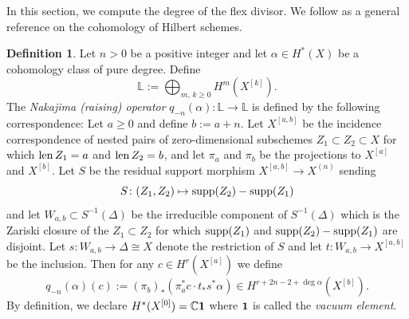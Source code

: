 \documentclass{amsart}
\theoremstyle{definition}
\newtheorem{definition}[theorem]{Definition}
\newcommand{\C}{\mathbb{C}}
\begin{document}
In this section, we compute the degree of the flex divisor. We follow
\cite{ellingsrud2000hilbert}
as a general reference on the cohomology of Hilbert schemes.
%
%


\begin{definition}\label{nakajima} Let $n>0$ be a positive integer and let $\alpha\in H^*(X)$ be a
cohomology class of pure degree. Define $$\mathbb{L}:=\bigoplus_{m,\,k\geq 0} H^m(X^{[k]}).$$
The {\it Nakajima (raising) operator} $q_{-n}(\alpha):\mathbb{L}\to \mathbb{L}$ is defined by
the following correspondence: Let $a\geq 0$ and define $b:=a+n$. Let $X^{[a,b]}$ 
be the incidence correspondence of nested pairs of zero-dimensional 
subschemes $Z_1\subset Z_2\subset X$ for which ${\rm len}\,Z_1=a$ and ${\rm len}\,Z_2=b$,
and let $\pi_a$ and $\pi_b$ be the projections to $X^{[a]}$ and $X^{[b]}$. Let $S$ be the 
residual support morphism $X^{[a,b]}\to X^{(n)}$ sending
$$S\colon (Z_1, Z_2)\mapsto {\rm supp}(Z_2)-{\rm supp}(Z_1)$$ and let $W_{a,b}\subset S^{-1}(\Delta)$
be the irreducible component of $S^{-1}(\Delta)$ which is the Zariski closure of the $Z_1\subset Z_2$
for which ${\rm supp}(Z_1)$
and ${\rm supp}(Z_2)-{\rm supp}(Z_1)$ are disjoint. Let
$s:W_{a,b}\to \Delta\cong X$ denote the restriction of $S$
and let $t:W_{a,b}\to X^{[a,b]}$ be the inclusion.
Then for any $c\in H^r(X^{[a]})$ we define
$$q_{-n}(\alpha) (c):=(\pi_b)_*(\pi_a^*c \cdot t_*s^*\alpha)\in H^{r+2n-2+\deg \alpha}(X^{[b]}).$$
By definition, we declare $H^*(X^{[0]})=\C{\bf 1}$ where ${\bf 1}$ is called
the {\it vacuum element}.
\end{definition}
\end{document}
